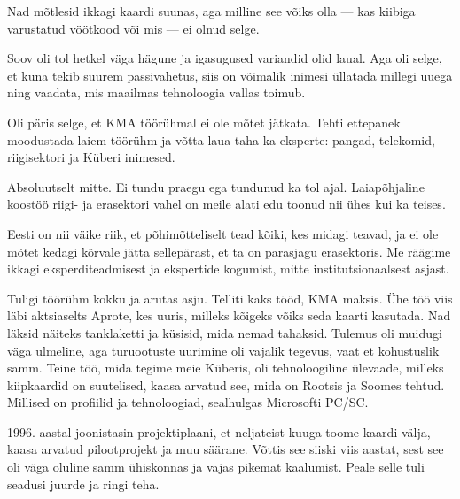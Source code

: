 
Nad mõtlesid ikkagi kaardi suunas, aga milline see võiks olla --- 
kas kiibiga varustatud vöötkood või mis --- ei olnud selge. 


Soov oli tol hetkel väga hägune ja igasugused 
variandid olid laual. Aga oli selge, et kuna tekib suurem 
passivahetus, siis on võimalik inimesi üllatada millegi uuega ning vaadata, mis 
maailmas tehnoloogia vallas toimub. 

Oli päris selge, et KMA 
töörühmal ei ole mõtet jätkata. Tehti ettepanek moodustada 
laiem töörühm ja võtta laua taha ka eksperte: pangad, 
telekomid, riigisektori ja Küberi inimesed.


Absoluutselt mitte. Ei tundu praegu ega tundunud ka tol ajal. 
Laiapõhjaline koostöö riigi- ja erasektori vahel on meile alati edu 
toonud nii ühes kui ka teises. 


Eesti on nii väike riik, et põhimõtteliselt tead kõiki, kes midagi teavad, ja 
ei ole mõtet kedagi kõrvale jätta sellepärast, et ta on parasjagu erasektoris. Me räägime ikkagi eksperditeadmisest ja 
ekspertide kogumist, mitte institutsionaalsest asjast. 

Tuligi töörühm kokku ja arutas asju. Telliti kaks tööd, 
KMA maksis. Ühe töö viis läbi 
aktsiaselts Aprote, kes uuris, milleks kõigeks 
võiks seda kaarti kasutada. Nad läksid näiteks tanklaketti ja küsisid, 
mida nemad tahaksid. Tulemus oli muidugi väga ulmeline, aga turuootuste uurimine oli 
vajalik tegevus, vaat et kohustuslik samm. 
Teine töö, mida tegime meie Küberis, oli 
tehnoloogiline ülevaade, milleks kiipkaardid on suutelised, kaasa
arvatud see, mida on Rootsis ja Soomes tehtud. 
Millised on profiilid ja tehnoloogiad, sealhulgas Microsofti 
PC/SC. 

1996. aastal joonistasin projektiplaani, et neljateist kuuga 
toome kaardi välja, kaasa arvatud pilootprojekt ja muu säärane. Võttis see siiski viis 
aastat, sest see oli väga oluline samm ühiskonnas 
ja vajas pikemat kaalumist. Peale selle tuli seadusi juurde ja ringi teha. 

